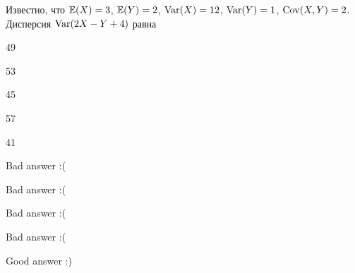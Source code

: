 
\begin{question}
Известно, что \(\operatorname{\mathbb{E}}(X)=3\), \(\operatorname{\mathbb{E}}(Y)=2\), \(\operatorname{Var}(X)=12\), \(\operatorname{Var}(Y)=1\),
\(\operatorname{Cov}(X,Y)=2\). Дисперсия \(\operatorname{Var}(2X-Y+4)\) равна
\begin{answerlist}
  \item 49
  \item 53
  \item 45
  \item 57
  \item 41
\end{answerlist}
\end{question}

\begin{solution}
\begin{answerlist}
  \item Bad answer :(
  \item Bad answer :(
  \item Bad answer :(
  \item Bad answer :(
  \item Good answer :)
\end{answerlist}
\end{solution}

